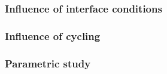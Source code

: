 \subsubsection{Influence of interface conditions}

\subsubsection{Influence of cycling}
\subsubsection{Parametric study}
